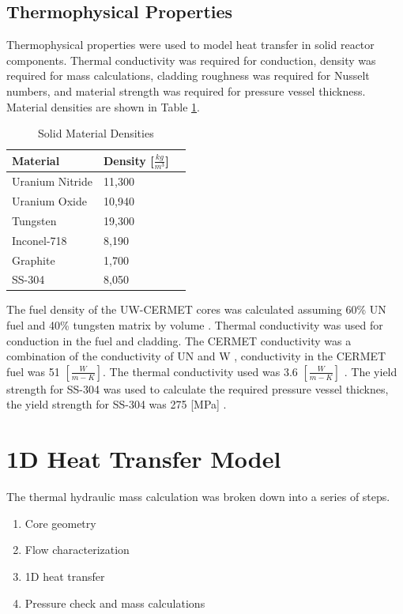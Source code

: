 \subsection{Thermophysical Properties}
Thermophysical properties were used to model heat transfer in solid reactor
components. Thermal conductivity was required for conduction, density was
required for mass calculations, cladding roughness was required for Nusselt
numbers, and material strength was required for pressure vessel thickness.
Material densities are shown in Table \ref{tab:densities}.

\begin{table}[h]
  \centering
  \caption{Solid Material Densities}
  \begin{tabular}{lll}
    \toprule
     Material        & Density  [$\frac{kg}{m^3}$]     \\ 
    \midrule                                  
     Uranium Nitride & 11,300 \\
     Uranium Oxide   & 10,940 \\
     Tungsten        & 19,300 \\
     Inconel-718     & 8,190  \\
     Graphite        & 1,700  \\
     SS-304          & 8,050
  \end{tabular}
  \label{tab:densities}
\end{table}

The fuel density of the UW-CERMET cores was calculated assuming 60\% UN fuel and
40\% tungsten matrix by volume \citep{conduct_cermet}. Thermal conductivity was
used for conduction in the fuel and cladding. The CERMET conductivity was a
combination of the conductivity of UN and W \citep{conduct_cermet}, conductivity
in the CERMET fuel was 51 $[\frac{W}{m-K}]$. The \uox thermal conductivity used
was 3.6 $[\frac{W}{m-K}]$ \citep{todreas_th}. The yield strength for SS-304 was
used to calculate the required pressure vessel thicknes, the yield strength for
SS-304 was 275 [MPa] \citep{ss_strength}.

\section{1D Heat Transfer Model}
The thermal hydraulic mass calculation was broken down into a series of steps.
\begin{enumerate}
    \item Core geometry
    \item Flow characterization
    \item 1D heat transfer
    \item Pressure check and mass calculations
\end{enumerate}

